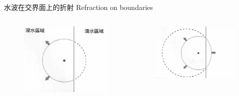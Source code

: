 \documentclass[beamer=true]{standalone}
\begin{document}
\begin{frame}{水波在交界面上的折射 Refraction on boundaries}
    \begin{columns}
        \begin{figure}
            \centering
            \includegraphics[width=1\linewidth]{images/Screenshot 2023-09-27 at 8.28.32 PM.png}


        \end{figure}
        \begin{figure}
            \centering
            \includegraphics[width=1\linewidth]{images/Screenshot 2023-09-27 at 8.28.43 PM.png}


        \end{figure}
    \end{columns}
\end{frame}
\end{document}
